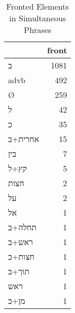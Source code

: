 \begin{table}[htbp!]
\centering
\caption{Fronted Elements in Simultaneous Phrases}
\label{table:sim_front}
\begin{tabular}{lr}
\toprule
{} &  front \\
\midrule
\texthebrew{ב}                    &   1081 \\
advb                              &    492 \\
Ø                                 &    259 \\
\texthebrew{ל}                    &     42 \\
\texthebrew{כ}                    &     35 \\
\texthebrew{אחרית}+\texthebrew{ב} &     15 \\
\texthebrew{בין}                  &      7 \\
\texthebrew{קץ}+\texthebrew{ל}    &      5 \\
\texthebrew{חצות}                 &      2 \\
\texthebrew{על}                   &      2 \\
\texthebrew{אל}                   &      1 \\
\texthebrew{תחלה}+\texthebrew{ב}  &      1 \\
\texthebrew{ראש}+\texthebrew{ב}   &      1 \\
\texthebrew{חצות}+\texthebrew{כ}  &      1 \\
\texthebrew{תוך}+\texthebrew{ב}   &      1 \\
\texthebrew{ראש}                  &      1 \\
\texthebrew{מן}+\texthebrew{כ}    &      1 \\
\bottomrule
\end{tabular}
\end{table}
